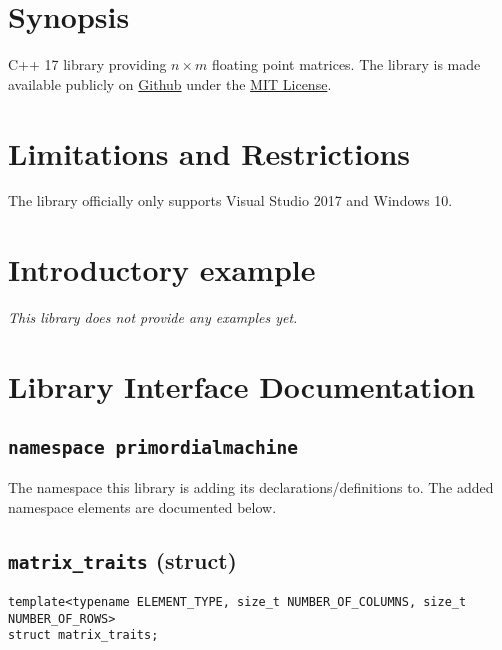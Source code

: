 \documentclass[oneside]{book}
\begin{document}
\frontmatter

\begin{titlepage}
\maketitle
\end{titlepage}

\tableofcontents
{}

\mainmatter

\chapter{Synopsis}
C++ 17 library providing $n \times m$ floating point matrices. 
The library is made available publicly on
\href{\GetLibraryRepository}{Github}
under the
\href{\GetLibraryRepository/blob/master/LICENSE}{MIT License}.

\chapter{Limitations and Restrictions}
The library officially only supports Visual Studio 2017 and Windows 10.

\chapter{Introductory example}
\textit{\color{orange}This library does not provide any examples yet.}



\chapter{Library Interface Documentation}

\section{\texttt{namespace primordialmachine}}
The namespace this library is adding its declarations/definitions to.
The added namespace elements are documented below.

\section{\texttt{matrix\_traits} (struct)}
\begin{verbatim}
template<typename ELEMENT_TYPE, size_t NUMBER_OF_COLUMNS, size_t NUMBER_OF_ROWS>
struct matrix_traits;
\end{verbatim}
\end{document}
